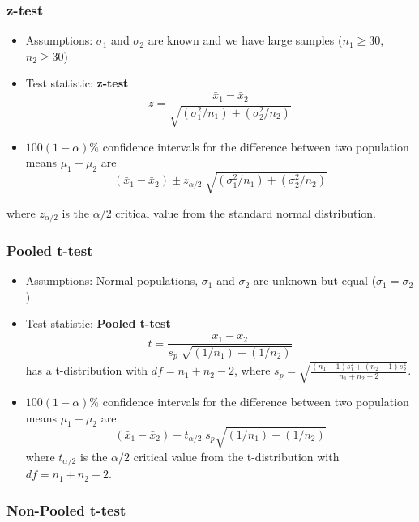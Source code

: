 \documentclass[
]{article}
\begin{document}
\hypertarget{z-test}{%
\subsubsection{z-test}\label{z-test}}

\begin{itemize}
\item
  Assumptions: \(\sigma_1\) and \(\sigma_2\) are known and we have large
  samples (\(n_1\geq30\), \(n_2\geq30\))
\item
  Test statistic: \textbf{z-test}
  \[z=\frac{\bar{x}_{1} -\bar{x}_{2} }{\sqrt{(\sigma_1^2 /n_1 )+(\sigma_2^2 /n_2 )} } \]
\item
  \(100(1- \alpha)\%\) confidence intervals for the difference between
  two population means \(\mu_{1} -\mu_{2}\) are
  \[(\bar{x}_{1} -\bar{x}_{2} )\pm z_{\alpha /2} \; \sqrt{(\sigma_{1}^{2} /n_{1} )+(\sigma_{2}^{2} /n_{2} )} \]
\end{itemize}

where \(z_{\alpha/2}\) is the \(\alpha/2\) critical value from the
standard normal distribution.

\hypertarget{pooled-t-test}{%
\subsubsection{Pooled t-test}\label{pooled-t-test}}

\begin{itemize}
\item
  Assumptions: Normal populations, \(\sigma_1\) and \(\sigma_2\) are
  unknown but equal (\(\sigma_1 = \sigma_2\))
\item
  Test statistic: \textbf{Pooled t-test}
  \[t=\frac{\bar{x}_{1} -\bar{x}_{2} }{s_{p} \; \sqrt{(1/n_{1} )+(1/n_{2} )} } \]
  has a t-distribution with \(df=n_{1} +n_{2} -2\), where
  \(s_{p} =\sqrt{\frac{(n_{1} -1)s_{1}^{2} +(n_{2} -1)s_{2}^{2} }{n_{1} +n_{2} -2} }\).
\item
  \(100(1- \alpha)\%\) confidence intervals for the difference between
  two population means \(\mu_{1} -\mu_{2}\) are
  \[(\bar{x}_{1} -\bar{x}_{2} )\pm t_{\alpha /2} \; s_{p} \sqrt{(1/n_{1} )+(1/n_{2} )} \]
  where \(t_{\alpha/2}\) is the \(\alpha/2\) critical value from the
  t-distribution with \(df=n_{1} +n_{2} -2\).
\end{itemize}

\hypertarget{non-pooled-t-test}{%
\subsubsection{Non-Pooled t-test}\label{non-pooled-t-test}}
\end{document}

